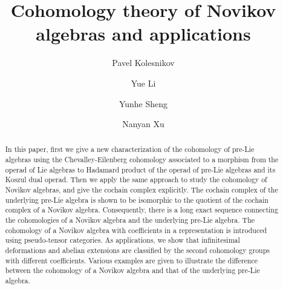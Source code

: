 \documentclass[12pt]{amsart}
\theoremstyle{definition}
\begin{document}
	
\title[Cohomology theory of Novikov algebras and applications]{Cohomology theory of Novikov algebras and applications}





\author{Pavel Kolesnikov}
\address{Sobolev Institute of Mathematics, Acad. Koptyug ave. 4, Novosibirsk, Russia}

\author{Yue Li}
\address{Department of Mathematics, Jilin University, Changchun 130012, Jilin, China}

\author{Yunhe Sheng}
\address{Department of Mathematics, Jilin University, Changchun 130012, Jilin, China}

\author{Nanyan Xu}
\address{Department of Mathematics, Jilin University, Changchun 130012, Jilin, China}


\begin{abstract}
	In this paper, first we give a new characterization of the cohomology of pre-Lie algebras using the Chevalley-Eilenberg cohomology associated to a morphism from the operad of Lie algebras to Hadamard product of the operad of pre-Lie algebras and its Koszul dual operad. Then we apply the same approach to study the cohomology of Novikov algebras, and give the cochain complex explicitly. The cochain complex of the underlying pre-Lie algebra is shown to be isomorphic to
	 the quotient of the cochain complex of a Novikov algebra. Consequently, there is a long exact sequence connecting the cohomologies of a Novikov algebra and the underlying pre-Lie algebra. The cohomology of a Novikov algebra with coefficients in a representation is introduced using pseudo-tensor categories. As applications, we show that infinitesimal deformations and abelian extensions are classified by the second cohomology groups with different coefficients. Various examples are given to illustrate the difference between the cohomology of a Novikov algebra and that of the underlying pre-Lie algebra.
\end{abstract}

\renewcommand{\thefootnote}{}



\maketitle
\end{document}

